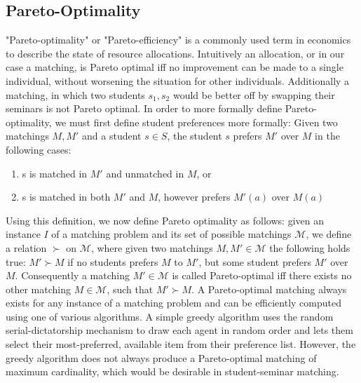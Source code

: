 \subsection{Pareto-Optimality}
"Pareto-optimality" or "Pareto-efficiency" is a commonly used term in economics to describe the state of resource allocations. Intuitively an allocation, or in our case a matching, is Pareto optimal iff no improvement can be made to a single individual, without worsening the situation for other individuals. Additionally a matching, in which two students $s_1, s_2$ would be better off by swapping their seminars is not Pareto optimal.
In order to more formally define Pareto-optimality, we must first define student preferences more formally: 
\newline
Given two matchings $M, M'$ and a student $s \in S$, the student $s$ prefers $M'$ over $M$ in the following cases:
\begin{enumerate}
    \item s is matched in $M'$ and unmatched in $M$, or
    \item s is matched in both $M'$ and $M$, however prefers $M'(a)$ over $M(a)$
\end{enumerate}
Using this definition, we now define Pareto optimality as follows: given an instance $I$ of a matching problem and its set of possible matchings $\mathcal{M}$, we define a relation $\succ$ on $\mathcal{M}$, where given two matchings $M, M' \in \mathcal{M}$ the following holds true: $M' \succ M$ if no students prefers $M$ to $M'$, but some student prefers $M'$ over $M$. Consequently a matching $M' \in \mathcal{M}$ is called Pareto-optimal iff there exists no other matching $M \in \mathcal{M}$, such that $M' \succ M$.\cite{algorithmics}
A Pareto-optimal matching always exists for any instance of a matching problem and can be efficiently computed using one of various algorithms. A simple greedy algorithm uses the random serial-dictatorship mechanism to draw each agent in random order and lets them select their most-preferred, available item from their preference list.\cite{RothTwoSided, SerialDictatorship} However, the greedy algorithm does not always produce a Pareto-optimal matching of maximum cardinality, which would be desirable in student-seminar matching.\cite{Abraham:Pacha}

